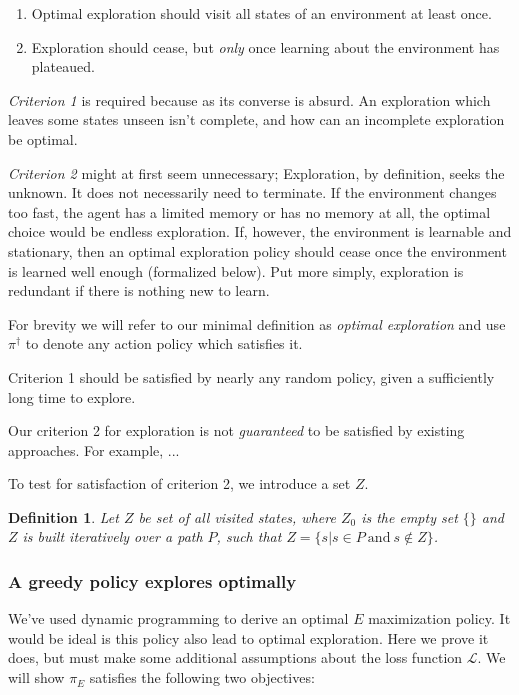\documentclass[9pt,twocolumn,twoside]{pnas-new}
\newtheorem{definition}{Definition}
\begin{document}
\begin{enumerate}[noitemsep,wide=0pt,leftmargin=\dimexpr\labelwidth+2\labelsep\relax]
    \item Optimal exploration should visit all states of an environment at least once. 
    \item Exploration should cease, but \textit{only} once learning about the environment has plateaued. 
\end{enumerate}

\textit{Criterion 1} is required because as its converse is absurd. An exploration which leaves some states unseen isn't complete, and how can an incomplete exploration be optimal.

\textit{Criterion 2} might at first seem unnecessary; Exploration, by definition, seeks the unknown. It does not necessarily need to terminate. If the environment changes too fast, the agent has a limited memory or has no memory at all, the optimal choice would be endless exploration. If, however, the environment is learnable and stationary, then an optimal exploration policy should cease once the environment is learned well enough (formalized below). Put more simply, exploration is redundant if there is nothing new to learn.

For brevity we will refer to our minimal definition as \textit{optimal exploration} and use $\pi^{\dagger}$ to denote any action policy which satisfies it.

Criterion 1 should be satisfied by nearly any random policy, given a sufficiently long time to explore.

Our criterion 2 for exploration is not \textit{guaranteed} to be satisfied by existing approaches.  For example, ... %

To test for satisfaction of criterion 2, we introduce a set $Z$. 

\begin{definition}
    Let $Z$ be set of all visited states, where $Z_0$ is the empty set $\{\}$ and $Z$ is built iteratively over a path $P$, such that $Z = \{s | s \in P\ \text{and}\ s \not\in Z\}$.    
\end{definition}


\subsubsection*{A greedy policy explores optimally}
We've used dynamic programming to derive an optimal $E$ maximization policy. It would be ideal is this policy also lead to optimal exploration. Here we prove it does, but must make some additional assumptions about the loss function $\mathcal{L}$. We will show $\pi_E$ satisfies the following two objectives:
\end{document}

